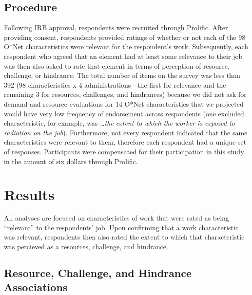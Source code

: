 \documentclass[
  man]{apa6}
\begin{document}
\hypertarget{procedure}{%
\subsection{Procedure}\label{procedure}}

Following IRB approval, respondents were recruited through Prolific. After providing consent, respondents provided ratings of whether or not each of the 98 O*Net characteristics were relevant for the respondent's work. Subsequently, each respondent who agreed that an element had at least some relevance to their job was then also asked to rate that element in terms of perception of resource, challenge, or hindrance. The total number of items on the survey was less than 392 (98 characteristics x 4 administrations - the first for relevance and the remaining 3 for resources, challenges, and hindrances) because we did not ask for demand and resource evaluations for 14 O*Net characteristics that we projected would have very low frequency of endorsement across respondents (one excluded characteristic, for example, was \emph{\ldots the extent to which the worker is exposed to radiation on the job}). Furthermore, not every respondent indicated that the same characteristics were relevant to them, therefore each respondent had a unique set of responses. Participants were compensated for their participation in this study in the amount of six dollars through Prolific.

\hypertarget{results}{%
\section{Results}\label{results}}

All analyses are focused on characteristics of work that were rated as being ``relevant'' to the respondents' job. Upon confirming that a work characteristic was relevant, respondents then also rated the extent to which that characteristic was percieved as a resources, challenge, and hindrance.

\hypertarget{resource-challenge-and-hindrance-associations}{%
\subsection{Resource, Challenge, and Hindrance Associations}\label{resource-challenge-and-hindrance-associations}}
\end{document}
